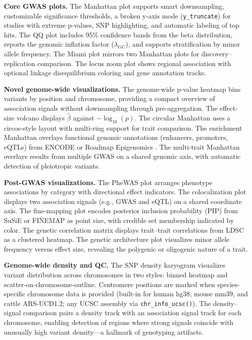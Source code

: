 \documentclass{bioinfo}
\begin{document}
\textbf{Core GWAS plots.} The Manhattan plot supports smart downsampling, customizable significance thresholds, a broken y-axis mode (\texttt{y\_truncate}) for studies with extreme p-values, SNP highlighting, and automatic labeling of top hits. The QQ plot includes 95\% confidence bands from the beta distribution, reports the genomic inflation factor ($\lambda_{GC}$), and supports stratification by minor allele frequency. The Miami plot mirrors two Manhattan plots for discovery--replication comparison. The locus zoom plot shows regional association with optional linkage disequilibrium coloring and gene annotation tracks.

\textbf{Novel genome-wide visualizations.} The genome-wide p-value heatmap bins variants by position and chromosome, providing a compact overview of association signals without downsampling through pre-aggregation. The effect-size volcano displays $\hat{\beta}$ against $-\log_{10}(p)$. The circular Manhattan uses a circos-style layout with multi-ring support for trait comparison. The enrichment Manhattan overlays functional genomic annotations (enhancers, promoters, eQTLs) from ENCODE \citep{encode2012} or Roadmap Epigenomics \citep{roadmap2015}. The multi-trait Manhattan overlays results from multiple GWAS on a shared genomic axis, with automatic detection of pleiotropic variants.

\textbf{Post-GWAS visualizations.} The PheWAS plot arranges phenotype associations by category with directional effect indicators. The colocalization plot displays two association signals (e.g., GWAS and eQTL) on a shared coordinate axis. The fine-mapping plot encodes posterior inclusion probability (PIP) from SuSiE \citep{wang2020} or FINEMAP \citep{benner2016} as point size, with credible set membership indicated by color. The genetic correlation matrix displays trait--trait correlations from LDSC \citep{bulik2015} as a clustered heatmap. The genetic architecture plot visualizes minor allele frequency versus effect size, revealing the polygenic or oligogenic nature of a trait.

\textbf{Genome-wide density and QC.} The SNP density karyogram visualizes variant distribution across chromosomes in two styles: binned heatmap and scatter-on-chromosome-outline. Centromere positions are marked when species-specific chromosome data is provided (built-in for human hg38, mouse mm39, and cattle ARS-UCD1.2; any UCSC assembly via \texttt{chr\_info\_ucsc()}). The density--signal comparison pairs a density track with an association signal track for each chromosome, enabling detection of regions where strong signals coincide with unusually high variant density---a hallmark of genotyping artifacts.
\end{document}
